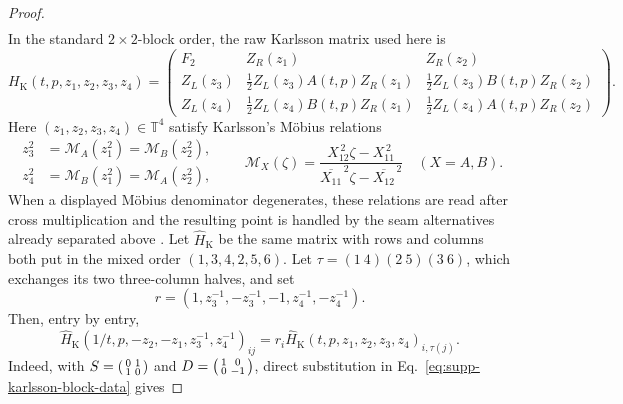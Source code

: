 \documentclass[aps,prx,reprint,nofootinbib,twoside,superscriptaddress,longbibliography,floatfix]{revtex4-2}
\theoremstyle{definition}
\newcommand{\T}{\mathbb T}
\begin{document}
\begin{proof}
\begin{equation}
\begin{gathered}
\end{gathered}
\label{eq:supp-karlsson-block-data}
\end{equation}
In the standard $2\times2$-block order, the raw Karlsson matrix used here is
\begin{equation}
 H_{\mathrm K}(t,p,z_1,z_2,z_3,z_4)=
 \begin{pmatrix}
 F_2&Z_R(z_1)&Z_R(z_2)\\
 Z_L(z_3)&\frac12Z_L(z_3)A(t,p)Z_R(z_1)
             &\frac12Z_L(z_3)B(t,p)Z_R(z_2)\\
 Z_L(z_4)&\frac12Z_L(z_4)B(t,p)Z_R(z_1)
             &\frac12Z_L(z_4)A(t,p)Z_R(z_2)
 \end{pmatrix}.
\label{eq:supp-karlsson-raw-matrix}
\end{equation}
Here $(z_1,z_2,z_3,z_4)\in\T^4$ satisfy Karlsson's M\"obius relations
\begin{equation}
\begin{aligned}
z_3^2&=\mathcal M_A(z_1^2)=\mathcal M_B(z_2^2),\\
z_4^2&=\mathcal M_B(z_1^2)=\mathcal M_A(z_2^2),
\end{aligned}
\qquad
\mathcal M_X(\zeta)=
\frac{X_{12}^{\,2}\zeta-X_{11}^{\,2}}
{\overline{X_{11}}^{\,2}\zeta-\overline{X_{12}}^{\,2}}
\quad(X=A,B).
\label{eq:supp-karlsson-mobius-domain}
\end{equation}
When a displayed M\"obius denominator degenerates, these relations are read after cross multiplication and the resulting point is handled by the seam alternatives already separated above \cite{Karlsson2011H2,Karlsson2011ThreeParameter}. Let $\widehat H_{\mathrm K}$ be the same matrix with rows and columns both put in the mixed order $(1,3,4,2,5,6)$.  Let $\tau=(1\ 4)(2\ 5)(3\ 6)$, which exchanges its two three-column halves, and set
\begin{equation}
 r=(1,z_3^{-1},-z_3^{-1},-1,z_4^{-1},-z_4^{-1}).
\label{eq:supp-karlsson-reciprocal-phases}
\end{equation}
Then, entry by entry,
\begin{equation}
 \widehat H_{\mathrm K}(1/t,p,-z_2,-z_1,z_3^{-1},z_4^{-1})_{ij}
 =r_i\widehat H_{\mathrm K}(t,p,z_1,z_2,z_3,z_4)_{i,\tau(j)}.
\label{eq:supp-karlsson-reciprocal-entrywise}
\end{equation}
Indeed, with $S=\begin{psmallmatrix}0&1\\1&0\end{psmallmatrix}$ and $D=\begin{psmallmatrix}1&0\\0&-1\end{psmallmatrix}$, direct substitution in Eq.~\eqref{eq:supp-karlsson-block-data} gives

\end{proof}
\end{document}
